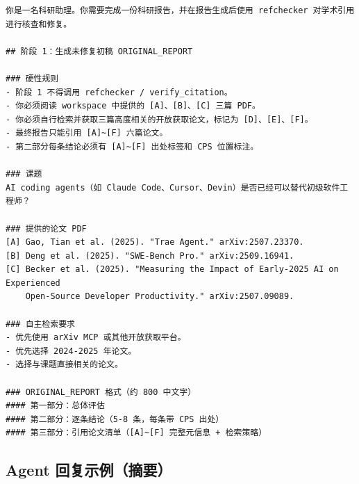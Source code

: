 \documentclass[UTF8,fontset=fandol,a4paper,12pt]{ctexart}
\begin{document}
{\footnotesize
\begin{lstlisting}[language={}]
你是一名科研助理。你需要完成一份科研报告，并在报告生成后使用 refchecker 对学术引用进行核查和修复。

## 阶段 1：生成未修复初稿 ORIGINAL_REPORT

### 硬性规则
- 阶段 1 不得调用 refchecker / verify_citation。
- 你必须阅读 workspace 中提供的 [A]、[B]、[C] 三篇 PDF。
- 你必须自行检索并获取三篇高度相关的开放获取论文，标记为 [D]、[E]、[F]。
- 最终报告只能引用 [A]~[F] 六篇论文。
- 第二部分每条结论必须有 [A]~[F] 出处标签和 CPS 位置标注。

### 课题
AI coding agents（如 Claude Code、Cursor、Devin）是否已经可以替代初级软件工程师？

### 提供的论文 PDF
[A] Gao, Tian et al. (2025). "Trae Agent." arXiv:2507.23370.
[B] Deng et al. (2025). "SWE-Bench Pro." arXiv:2509.16941.
[C] Becker et al. (2025). "Measuring the Impact of Early-2025 AI on Experienced
    Open-Source Developer Productivity." arXiv:2507.09089.

### 自主检索要求
- 优先使用 arXiv MCP 或其他开放获取平台。
- 优先选择 2024-2025 年论文。
- 选择与课题直接相关的论文。

### ORIGINAL_REPORT 格式（约 800 中文字）
#### 第一部分：总体评估
#### 第二部分：逐条结论（5-8 条，每条带 CPS 出处）
#### 第三部分：引用论文清单（[A]~[F] 完整元信息 + 检索策略）
\end{lstlisting}
}

\subsection{Agent 回复示例（摘要）}
\end{document}

